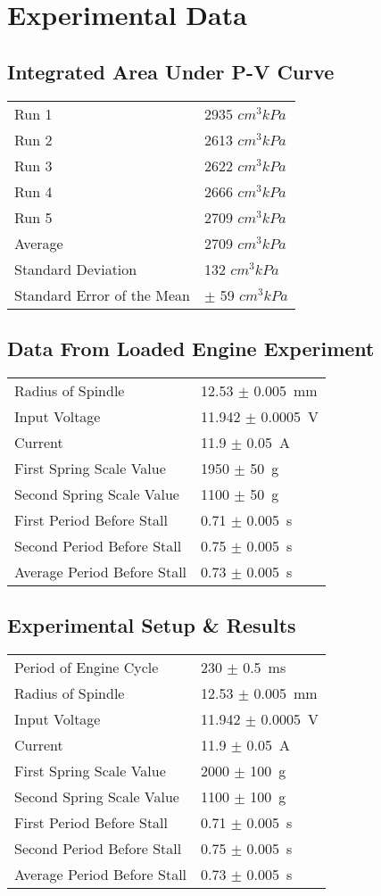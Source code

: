 \documentclass{article}
\begin{document}
\section{Experimental Data}
\subsection{Integrated Area Under P-V Curve}
\begin{tabular}{ll}
Run 1 & 2935 $cm^3kPa$\\
Run 2 & 2613 $cm^3kPa$\\
Run 3 & 2622 $cm^3kPa$\\
Run 4 & 2666 $cm^3kPa$\\
Run 5 & 2709 $cm^3kPa$\\
Average & 2709 $cm^3kPa$\\
Standard Deviation & 132 $cm^3kPa$\\
Standard Error of the Mean & $\pm$ 59 $cm^3kPa$\\

\end{tabular}
\subsection{Data From Loaded Engine Experiment}
\begin{tabular}{ll}
Radius of Spindle & 12.53 $\pm$ \SI{0.005}{\mm}\\
Input Voltage & 11.942 $\pm$ \SI{0.0005}{\V}\\
Current & 11.9 $\pm$ \SI{0.05}{\A}\\
First Spring Scale Value & 1950 $\pm$ \SI{50}{\g}\\
Second Spring Scale Value& 1100 $\pm$ \SI{50}{\g}\\
First Period Before Stall & 0.71 $\pm$ \SI{0.005}{\s}\\
Second Period Before Stall & 0.75 $\pm$ \SI{0.005}{\s}\\
Average Period Before Stall & 0.73 $\pm$ \SI{0.005}{\s}\\
\end{tabular}
\subsection{Experimental Setup \& Results}
\begin{tabular}{ll}
Period of Engine Cycle & 230 $\pm$ \SI{0.5}{\ms}\\
Radius of Spindle & 12.53 $\pm$ \SI{0.005}{\mm}\\
Input Voltage & 11.942 $\pm$ \SI{0.0005}{\V}\\
Current & 11.9 $\pm$ \SI{0.05}{\A}\\
First Spring Scale Value & 2000 $\pm$ \SI{100}{\g}\\
Second Spring Scale Value& 1100 $\pm$ \SI{100}{\g}\\
First Period Before Stall & 0.71 $\pm$ \SI{0.005}{\s}\\
Second Period Before Stall & 0.75 $\pm$ \SI{0.005}{\s}\\
Average Period Before Stall & 0.73 $\pm$ \SI{0.005}{\s}\\
\end{tabular}
\end{document}
